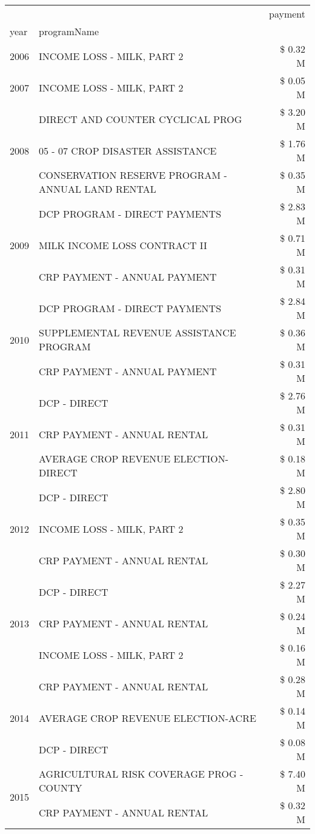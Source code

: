 \begin{tabular}{llr}
\toprule
 &  & payment \\
year & programName &  \\
\midrule
2006 & INCOME LOSS - MILK, PART 2 & \$ 0.32 M \\
\cline{1-3}
2007 & INCOME LOSS - MILK, PART 2 & \$ 0.05 M \\
\cline{1-3}
\multirow[t]{3}{*}{2008} & DIRECT AND COUNTER CYCLICAL PROG & \$ 3.20 M \\
 & 05 - 07 CROP DISASTER ASSISTANCE & \$ 1.76 M \\
 & CONSERVATION RESERVE PROGRAM - ANNUAL LAND RENTAL & \$ 0.35 M \\
\cline{1-3}
\multirow[t]{3}{*}{2009} & DCP PROGRAM - DIRECT PAYMENTS & \$ 2.83 M \\
 & MILK INCOME LOSS CONTRACT II & \$ 0.71 M \\
 & CRP PAYMENT - ANNUAL PAYMENT & \$ 0.31 M \\
\cline{1-3}
\multirow[t]{3}{*}{2010} & DCP PROGRAM - DIRECT PAYMENTS & \$ 2.84 M \\
 & SUPPLEMENTAL REVENUE ASSISTANCE PROGRAM & \$ 0.36 M \\
 & CRP PAYMENT - ANNUAL PAYMENT & \$ 0.31 M \\
\cline{1-3}
\multirow[t]{3}{*}{2011} & DCP - DIRECT & \$ 2.76 M \\
 & CRP PAYMENT - ANNUAL RENTAL & \$ 0.31 M \\
 & AVERAGE CROP REVENUE ELECTION-DIRECT & \$ 0.18 M \\
\cline{1-3}
\multirow[t]{3}{*}{2012} & DCP - DIRECT & \$ 2.80 M \\
 & INCOME LOSS - MILK, PART 2 & \$ 0.35 M \\
 & CRP PAYMENT - ANNUAL RENTAL & \$ 0.30 M \\
\cline{1-3}
\multirow[t]{3}{*}{2013} & DCP - DIRECT & \$ 2.27 M \\
 & CRP PAYMENT - ANNUAL RENTAL & \$ 0.24 M \\
 & INCOME LOSS - MILK, PART 2 & \$ 0.16 M \\
\cline{1-3}
\multirow[t]{3}{*}{2014} & CRP PAYMENT - ANNUAL RENTAL & \$ 0.28 M \\
 & AVERAGE CROP REVENUE ELECTION-ACRE & \$ 0.14 M \\
 & DCP - DIRECT & \$ 0.08 M \\
\cline{1-3}
\multirow[t]{3}{*}{2015} & AGRICULTURAL RISK COVERAGE PROG - COUNTY & \$ 7.40 M \\
 & CRP PAYMENT - ANNUAL RENTAL & \$ 0.32 M \\

\end{tabular}
